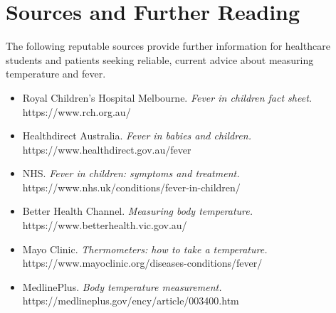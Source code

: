 \section*{Sources and Further Reading}
The following reputable sources provide further information for healthcare students and patients seeking reliable, current advice about measuring temperature and fever.
\begin{itemize}
    \item Royal Children's Hospital Melbourne. \textit{Fever in children fact sheet.} https://www.rch.org.au/
    \item Healthdirect Australia. \textit{Fever in babies and children.} https://www.healthdirect.gov.au/fever
    \item NHS. \textit{Fever in children: symptoms and treatment.} https://www.nhs.uk/conditions/fever-in-children/
    \item Better Health Channel. \textit{Measuring body temperature.} https://www.betterhealth.vic.gov.au/
    \item Mayo Clinic. \textit{Thermometers: how to take a temperature.} https://www.mayoclinic.org/diseases-conditions/fever/
    \item MedlinePlus. \textit{Body temperature measurement.} https://medlineplus.gov/ency/article/003400.htm
\end{itemize}
